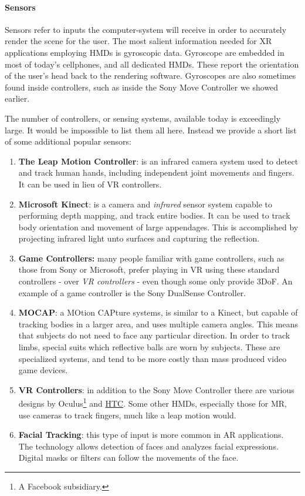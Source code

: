 \paragraph{Sensors}

Sensors refer to inputs the computer-system will receive in order to accurately render the scene for the user. The most salient information needed for XR applications employing HMDs is gyroscopic data. Gyroscope are embedded in most of today's cellphones, and all dedicated HMDs. These report the orientation of the user's head back to the rendering software. Gyroscopes are also sometimes found inside controllers, such as inside the Sony Move Controller we showed earlier. 

The number of controllers, or sensing systems, available today is exceedingly large. It would be impossible to list them all here. Instead we provide a short list of some additional popular sensors: 

\begin{enumerate}
    \item \textbf{The Leap Motion Controller}: is an infrared camera system used to detect and track human hands, including independent joint movements and fingers. It can be used in lieu of VR controllers.
    
    \item \textbf{Microsoft Kinect}: is a camera and \textit{infrared} sensor system capable to performing depth mapping, and track entire bodies. It can be used to track body orientation and movement of large appendages. This is accomplished by projecting infrared light unto surfaces and capturing the reflection. 
    
    \item \textbf{Game Controllers:} many people familiar with game controllers, such as those from Sony or Microsoft, prefer playing in VR using these standard controllers - over \textit{VR controllers} - even though some only provide 3DoF. An example of a game controller is the Sony DualSense Controller.
    
    \item \textbf{MOCAP}: a MOtion CAPture systems, is similar to a Kinect, but capable of tracking bodies in a larger area, and uses multiple camera angles. This means that subjects do not need to face any particular direction. In order to track limbs, special suits which reflective balls are worn by subjects. These are specialized systems, and tend to be more costly than mass produced video game devices. 
    \item \textbf{VR Controllers}: in addition to the Sony Move Controller there are various designs by Oculus\footnote{A Facebook subsidiary.} and \href{https://www.htc.com/us/}{HTC}. Some other HMDs, especially those for MR, use cameras to track fingers, much like a leap motion would. 
    
    \item \textbf{Facial Tracking}: this type of input is more common in AR applications. The technology allows detection of faces and analyzes facial expressions. Digital masks or filters can follow the movements of the face. 
\end{enumerate}

